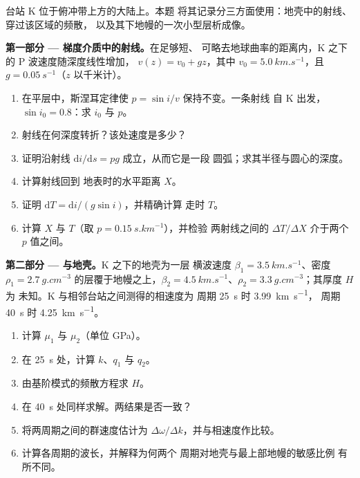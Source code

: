 \begin{problem}
\label{pb:b3:seismology-imaging:1}
台站 K 位于俯冲带上方的大陆上。本题
将其记录分三方面使用：地壳中的射线、穿过该区域的频散，
以及其下地幔的一次小型层析成像。

\medskip
\noindent\textbf{第一部分 --- 梯度介质中的射线。}在足够短、
可略去地球曲率的距离内，K 之下的 P 波速度随深度线性增加，
$v(z) = v_0 + gz$，其中 $v_0 = \qty{5.0}{km.s^{-1}}$，且
$g = \qty{0.05}{s^{-1}}$（$z$ 以千米计）。
\begin{enumerate}
  \item 在平层中，斯涅耳定律使 $p = \sin i/v$ 保持不变。一条射线
        自 K 出发，$\sin i_0 = 0.8$：求 $i_0$ 与 $p$。
  \item 射线在何深度转折？该处速度是多少？
  \item 证明沿射线 $\mathrm di/\mathrm ds = pg$ 成立，从而它是一段
        圆弧；求其半径与圆心的深度。
  \item 计算射线回到
        地表时的水平距离 $X$。
  \item 证明 $\mathrm dT = \mathrm di/(g\sin i)$，并精确计算
        走时 $T$。
  \item 计算 $X$ 与 $T$（取 $p = \qty{0.15}{s.km^{-1}}$），并检验
        两射线之间的 $\Delta T/\Delta X$ 介于两个
        $p$ 值之间。
\end{enumerate}

\noindent\textbf{第二部分 --- 与地壳。}K 之下的地壳为一层
横波速度 $\beta_1 = \qty{3.5}{km.s^{-1}}$、密度
$\rho_1 = \qty{2.7}{g.cm^{-3}}$ 的层覆于地幔之上，$\beta_2 =
\qty{4.5}{km.s^{-1}}$、$\rho_2 = \qty{3.3}{g.cm^{-3}}$；其厚度 $H$ 为
未知。K 与相邻台站之间测得的相速度为
周期 \qty{25}{s} 时 \qty{3.99}{km.s^{-1}}，
周期 \qty{40}{s} 时 \qty{4.25}{km.s^{-1}}。
\begin{enumerate}[resume]
  \item 计算 $\mu_1$ 与 $\mu_2$（单位 \unit{GPa}）。
  \item 在 \qty{25}{s} 处，计算 $k$、$q_1$ 与 $q_2$。
  \item 由基阶模式的频散方程求 $H$。
  \item 在 \qty{40}{s} 处同样求解。两结果是否一致？
  \item 将两周期之间的群速度估计为
        $\Delta\omega/\Delta k$，并与相速度作比较。
  \item 计算各周期的波长，并解释为何两个
        周期对地壳与最上部地幔的敏感比例
        有所不同。
\end{enumerate}


\end{problem}
